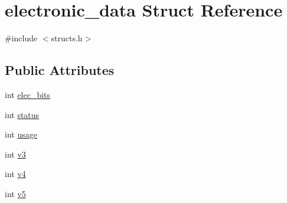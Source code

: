 \hypertarget{structelectronic__data}{\section{electronic\-\_\-data Struct Reference}
\label{structelectronic__data}
}


{\ttfamily \#include $<$structs.\-h$>$}

\subsection*{Public Attributes}
\begin{DoxyCompactItemize}
\item 
int \hyperlink{structelectronic__data_a23855f2faf03e1ab06b6a8987eba1e5e}{elec\-\_\-bits}
\item 
int \hyperlink{structelectronic__data_ae8da847532cdf8cbdbee95dc201709d2}{status}
\item 
int \hyperlink{structelectronic__data_a6a551e8806536286f4f2de9a1c97f229}{usage}
\item 
int \hyperlink{structelectronic__data_aa244c4cfa7aa3ef1e8d9c19c04f1840e}{v3}
\item 
int \hyperlink{structelectronic__data_a55b8f9b927cd6ecafe1f2d4edc4975c3}{v4}
\item 
int \hyperlink{structelectronic__data_a02993d0044d5ee7eaaf0d40a3531d60e}{v5}
\end{DoxyCompactItemize}


